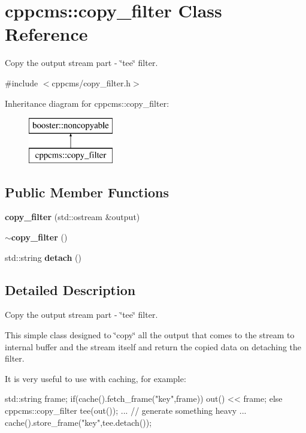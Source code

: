 \section{cppcms\-:\-:copy\-\_\-filter \-Class \-Reference}
\label{classcppcms_1_1copy__filter}


\-Copy the output stream part -\/ \char`\"{}tee\char`\"{} filter.  




{\ttfamily \#include $<$cppcms/copy\-\_\-filter.\-h$>$}

\-Inheritance diagram for cppcms\-:\-:copy\-\_\-filter\-:\begin{figure}[H]
\begin{center}
\leavevmode
\includegraphics[height=2.000000cm]{classcppcms_1_1copy__filter}
\end{center}
\end{figure}
\subsection*{\-Public \-Member \-Functions}
\begin{DoxyCompactItemize}
\item 
{\bf copy\-\_\-filter} (std\-::ostream \&output)
\item 
{\bf $\sim$copy\-\_\-filter} ()
\item 
std\-::string {\bf detach} ()
\end{DoxyCompactItemize}


\subsection{\-Detailed \-Description}
\-Copy the output stream part -\/ \char`\"{}tee\char`\"{} filter. 

\-This simple class designed to \char`\"{}copy\char`\"{} all the output that comes to the stream to internal buffer and the stream itself and return the copied data on detaching the filter.

\-It is very useful to use with caching, for example\-:


\begin{DoxyCode}
 std::string frame;
 if(cache().fetch_frame("key",frame)) {
   out() << frame;
 }
 else {
   cppcms::copy_filter tee(out());
   ...
   // generate something heavy
   ...
   cache().store_frame("key",tee.detach());
 }
\end{DoxyCode}
 

